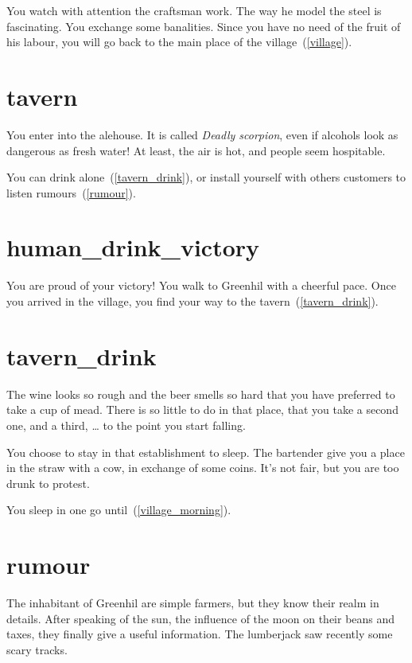 You watch with attention the craftsman work. The way he model the steel is
fascinating. You exchange some banalities. Since you have no need of the fruit
of his labour, you will go back to the main place of the village~(\ref{village}).

\section{tavern}

You enter into the alehouse. It is called \textit{Deadly scorpion}, even if
alcohols look as dangerous as fresh water! At least, the air is hot, and people
seem hospitable.

You can drink alone~(\ref{tavern_drink}), or install yourself with others
customers to listen rumours~(\ref{rumour}).

\section{human_drink_victory}

You are proud of your victory! You walk to Greenhil with a cheerful pace. Once
you arrived in the village, you find your way to the tavern~(\ref{tavern_drink}).

\section{tavern_drink}

The wine looks so rough and the beer smells so hard that you have preferred to
take a cup of mead. There is so little to do in that place, that you take a
second one, and a third, … to the point you start falling.

You choose to stay in that establishment to sleep. The bartender give you a place in the
straw with a cow, in exchange of some coins. It's not fair, but you are too drunk
to protest.

You sleep in one go until~(\ref{village_morning}).

\section{rumour}

The inhabitant of Greenhil are simple farmers, but they know their realm in
details. After speaking of the sun, the influence of the moon on their beans and
taxes, they finally give a useful information. The lumberjack saw recently
some scary tracks.

